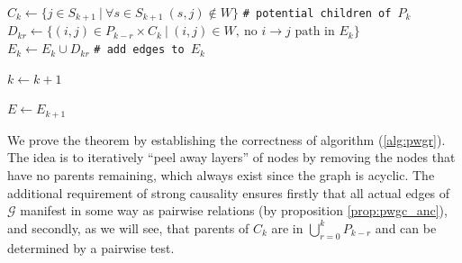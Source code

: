 \documentclass[12pt]{article}
\def\gcg{\mathcal{G}}  %
\begin{document}
\begin{theorem}
\begin{algorithm}
{      \;
      $C_k \leftarrow \{j \in S_{k + 1}\ |\ \forall s \in S_{k + 1}\ (s, j) \not\in W\}$   \texttt{\# potential children of }$P_k$\\

      {
        \label{alg:inner_loop}
        $D_{kr} \leftarrow \{(i, j) \in P_{k - r} \times C_k\ |\ (i, j) \in W,\ \text{no } i \rightarrow j \text{ path in } E_k \}$\\%
        $E_k \leftarrow E_k \cup D_{kr}$ \texttt{\# add edges to }$E_k$\\
      }

      \;
      $k \leftarrow k + 1$
    }
    $E \leftarrow E_{k + 1}$\\
  \end{algorithm}
\end{theorem}

We prove the theorem by establishing the correctness of algorithm (\ref{alg:pwgr}).  The idea is to iteratively ``peel away layers'' of nodes by removing the nodes that have no parents remaining, which always exist since the graph is acyclic.  The additional requirement of strong causality ensures firstly that all actual edges of $\gcg$ manifest in some way as pairwise relations (by proposition \ref{prop:pwgc_anc}), and secondly, as we will see, that parents of $C_k$ are in $\bigcup_{r = 0}^kP_{k - r}$ and can be determined by a pairwise test.
\end{document}
